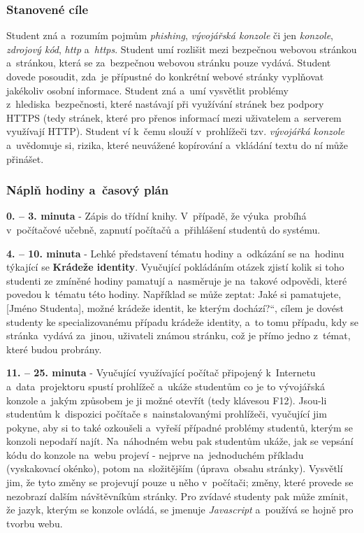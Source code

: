 \documentclass[a4paper, 12pt]{article}
\providecommand{\uv}[1]{\quotedblbase #1\textquotedblleft}
\begin{document}
\subsubsection{Stanovené cíle}
Student zná a~rozumím pojmům \textit{phishing}, \textit{vývojářská konzole} či jen \textit{konzole}, \textit{zdrojový kód}, \textit{http} a~\textit{https}. Student umí rozlišit mezi bezpečnou webovou stránkou a~stránkou, která se za~bezpečnou webovou stránku pouze vydává. Student dovede posoudit, zda~je přípustné do konkrétní webové stránky vyplňovat jakékoliv osobní informace. Student zná a~umí vysvětlit problémy z~hlediska~bezpečnosti, které nastávají při využívání stránek bez podpory HTTPS (tedy stránek, které pro přenos informací mezi uživatelem a~serverem využívají HTTP). Student ví k~čemu slouží v~prohlížeči tzv. \textit{vývojářká konzole} a~uvědomuje si, rizika, které neuvážené kopírování a~vkládání textu do ní může přinášet.

\subsubsection{Náplň hodiny a~časový plán}
\indent\textbf{0. -- 3. minuta} - Zápis do třídní knihy. V~případě, že výuka~probíhá v~počítačové učebně, zapnutí počítačů a~přihlášení studentů do systému.

\textbf{4. -- 10. minuta} - Lehké představení tématu hodiny a~odkázání se na~hodinu týkající se \textbf{Krádeže identity}. Vyučující pokládáním otázek zjistí kolik si toho studenti ze zmíněné hodiny pamatují a~nasměruje je na~takové odpovědi, které povedou k~tématu této hodiny. Například se může zeptat: \uv{Jaké si pamatujete, [Jméno Studenta], možné krádeže identit, ke kterým dochází?}, cílem je dovést studenty ke specializovanému případu krádeže identity, a~to tomu případu, kdy se stránka~vydává za~jinou, uživateli známou stránku, což je přímo jedno z~témat, které budou probrány.

\textbf{11. -- 25. minuta} - Vyučující využívající počítač připojený k~Internetu a~data~projektoru spustí prohlížeč a~ukáže studentům co je to vývojářská konzole a~jakým způsobem je ji možné otevřít (tedy klávesou F12). Jsou-li studentům k~dispozici počítače s~nainstalovanými prohlížeči, vyučující jim pokyne, aby si to také ozkoušeli a~vyřeší případné problémy studentů, kterým se konzoli nepodaří najít. Na~náhodném webu pak studentům ukáže, jak se vepsání kódu do konzole na~webu projeví - nejprve na~jednoduchém příkladu (vyskakovací okénko), potom na~složitějším (úprava~obsahu stránky). Vysvětlí jim, že tyto změny se projevují pouze u něho v~počítači; změny, které provede se nezobrazí dalším návštěvníkům stránky. Pro zvídavé studenty pak může zmínit, že jazyk, kterým se konzole ovládá, se jmenuje \textit{Javascript} a~používá se hojně pro tvorbu webu. 
\end{document}
